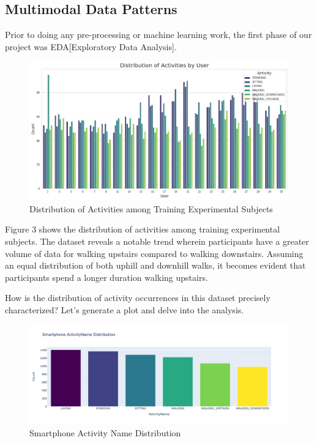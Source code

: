 \documentclass[conference]{IEEEtran}
\begin{document}
\subsection{Multimodal Data Patterns}
Prior to doing any pre-processing or machine learning work, the first phase of our project was EDA[Exploratory Data Analysis]. 

\begin{figure}[h!]
	\includegraphics[width= 1.0 \linewidth]{activity_distribution.png}
	\centering
	\caption{Distribution of Activities among Training Experimental Subjects}
	\label{activity_distribution.png}
\end{figure}

Figure 3 shows the distribution of activities among training experimental subjects. The dataset reveals a notable trend wherein participants have a greater volume of data for walking upstairs compared to walking downstairs. Assuming an equal distribution of both uphill and downhill walks, it becomes evident that participants spend a longer duration walking upstairs. \newline 

How is the distribution of activity occurrences in this dataset precisely characterized? Let's generate a plot and delve into the analysis.

\begin{figure}[h!]
	\includegraphics[width= 1.0 \linewidth]{smartphone_activity_name_distribution.png}
	\centering
	\caption{Smartphone Activity Name Distribution}
	\label{smartphone_activity_name_distribution.png}
\end{figure}
\end{document}
